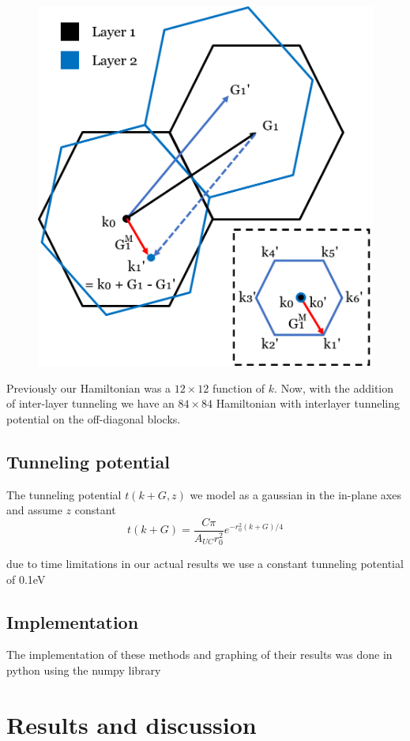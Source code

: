 \documentclass[12pt]{report} %
\begin{document}
\begin{figure}[t!]
\centering
\includegraphics[width=0.75\columnwidth]{k_prime_diagram.png}
  \caption{
  }
  \label{inter-layer_k_prime_diagram}
\end{figure}



  Previously our Hamiltonian was a $12\times12$ function of $k$. Now, with the  addition of inter-layer tunneling we have an $84\times84$ Hamiltonian with interlayer tunneling potential on the off-diagonal blocks.

\subsection*{Tunneling potential}

The tunneling potential $t(k + G, z)$ we model as a gaussian in the in-plane axes and assume $z$ constant
\begin{equation}
  t(k + G) = \frac{C\pi}{A_{UC} r_0^2}e^{- r_0^2 (k + G)/4}
\end{equation}

due to time limitations in our actual results we use a constant tunneling potential of 0.1eV

\subsection*{Implementation}
The implementation of these methods and graphing of their results was done in python using the numpy library

\section*{Results and discussion}
\end{document}
